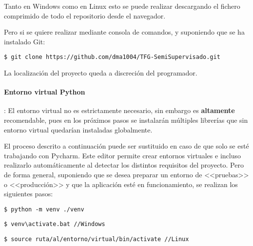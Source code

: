 
Tanto en Windows como en Linux esto se puede realizar descargando el fichero
comprimido de todo el repositorio desde el navegador.

Pero si se quiere realizar mediante consola de comandos, y suponiendo que se ha
instalado Git:

\begin{tcolorbox}[colback=cyan!5!white,colframe=cyan!75!black,fontupper=\footnotesize,title=Clonación de repositorio desde consola]
\begin{verbatim}
$ git clone https://github.com/dma1004/TFG-SemiSupervisado.git
\end{verbatim}
\end{tcolorbox}
La localización del proyecto queda a discreción del programador.

\paragraph{Entorno virtual Python}: El entorno virtual no es estrictamente
necesario, sin embargo es \textbf{altamente} recomendable, pues en los próximos
pasos se instalarán múltiples librerías que sin entorno virtual quedarían
instaladas globalmente.

El proceso descrito a continuación puede ser sustituido en caso de que solo se
esté trabajando con Pycharm. Este editor permite crear entornos virtuales e
incluso realizarlo automáticamente al detectar los distintos requisitos del
proyecto. Pero de forma general, suponiendo que se desea preparar un entorno de
<<pruebas>> o <<producción>> y que la aplicación esté en funcionamiento, se
realizan los siguientes pasos:


\begin{tcolorbox}[colback=cyan!5!white,colframe=orange!75!black,title=Creación del entorno virtual (dentro de la carpeta deseado)]
\begin{verbatim}
$ python -m venv ./venv
\end{verbatim}
\end{tcolorbox}


\begin{tcolorbox}[colback=cyan!5!white,colframe=cyan!75!black,fontupper=\footnotesize,fontlower=\footnotesize,title=Activación del entorno virtual]
\begin{verbatim}
$ venv\activate.bat //Windows
\end{verbatim}
\tcblower
\begin{verbatim}
$ source ruta/al/entorno/virtual/bin/activate //Linux
\end{verbatim}
\end{tcolorbox}

